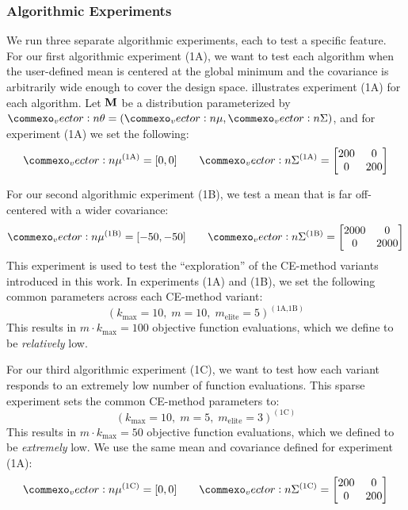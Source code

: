 \subsubsection{Algorithmic Experiments} \label{sec:cem_alg_experiments}
We run three separate algorithmic experiments, each to test a specific feature.
For our first algorithmic experiment (1A), we want to test each algorithm when the user-defined mean is centered at the global minimum and the covariance is arbitrarily wide enough to cover the design space.
 illustrates experiment (1A) for each algorithm.
Let $\mathbf{M}$ be a distribution parameterized by $\vec{\theta} = (\vec{\mu}, \mat{\Sigma})$, and for experiment (1A) we set the following:
\begin{equation*}
    \vec\mu^{(\text{1A})} = [0, 0] \qquad
    \mat\Sigma^{(\text{1A})} = \begin{bmatrix}
        200 & 0\\
        0 & 200
    \end{bmatrix}
\end{equation*}

For our second algorithmic experiment (1B), we test a mean that is far off-centered with a wider covariance:
\begin{equation*}
    \vec\mu^{(\text{1B})} = [-50, -50] \qquad
    \mat\Sigma^{(\text{1B})} = \begin{bmatrix}
        2000 & 0\\
        0 & 2000
    \end{bmatrix}
\end{equation*}
This experiment is used to test the ``exploration'' of the CE-method variants introduced in this work.
In experiments (1A) and (1B), we set the following common parameters across each CE-method variant:
\begin{equation*}
    (k_\text{max} = 10,\; m=10,\; m_\text{elite}=5)^{(\text{1A,1B})}
\end{equation*}
This results in $m\cdot k_\text{max} = 100$ objective function evaluations, which we define to be \textit{relatively} low.

For our third algorithmic experiment (1C), we want to test how each variant responds to an extremely low number of function evaluations.
This sparse experiment sets the common CE-method parameters to:
\begin{equation*}
    (k_\text{max} = 10,\; m=5,\; m_\text{elite}=3)^{(\text{1C})}
\end{equation*}
This results in $m\cdot k_\text{max} = 50$ objective function evaluations, which we defined to be \textit{extremely} low.
We use the same mean and covariance defined for experiment (1A):
\begin{equation*}
    \vec\mu^{(\text{1C})} = [0, 0] \qquad
    \mat\Sigma^{(\text{1C})} = \begin{bmatrix}
        200 & 0\\
        0 & 200
    \end{bmatrix}
\end{equation*}


